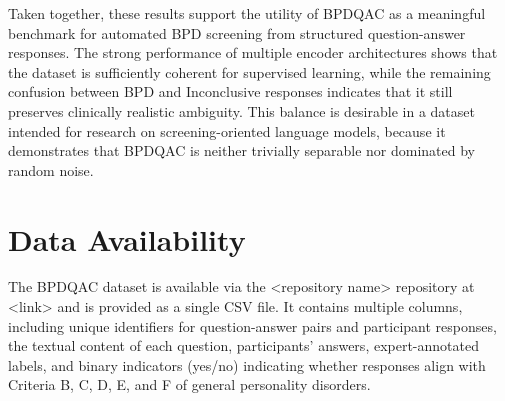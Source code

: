 \documentclass{article}
\begin{document}
Taken together, these results support the utility of BPDQAC as a meaningful benchmark for automated BPD screening from structured question-answer responses. The strong performance of multiple encoder architectures shows that the dataset is sufficiently coherent for supervised learning, while the remaining confusion between BPD and Inconclusive responses indicates that it still preserves clinically realistic ambiguity. This balance is desirable in a dataset intended for research on screening-oriented language models, because it demonstrates that BPDQAC is neither trivially separable nor dominated by random noise.


\section{Data Availability}\label{sec8}
The BPDQAC dataset is available via the <repository name> repository at <link> and is provided as a single CSV file. It contains multiple columns, including unique identifiers for question-answer pairs and participant responses, the textual content of each question, participants' answers, expert-annotated labels, and binary indicators (yes/no) indicating whether responses align with Criteria B, C, D, E, and F of general personality disorders.
\printbibliography
\end{document}

